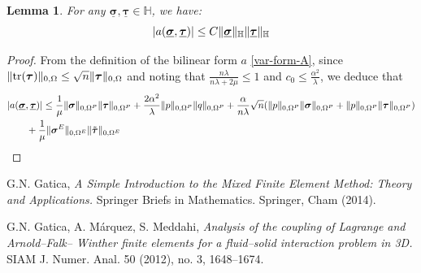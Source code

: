 \documentclass[11pt]{article}
\numberwithin{equation}{section}
\newtheorem{lem}[thm]{Lemma}
\newcommand{\tr}{\operatorname*{tr}}
\def\b{\boldsymbol}
\DeclarePairedDelimiter\norm{\lVert}{\rVert}
\DeclarePairedDelimiter\abs{\lvert}{\rvert}
\numberwithin{equation}{section}
\begin{document}
\begin{lem}
	For any $\underline{\b \sigma}, \underline{\b \tau} \in \mathbb{H}$, we have:
	\begin{equation*}
		\abs{a(\underline{\b \sigma},\underline{\b \tau})} \leq C \norm{\underline{\b \sigma}}_{\mathbb{H}} \norm{\underline{\b \tau}}_{\mathbb{H}}
	\end{equation*}
\end{lem}
\begin{proof}
	From the definition of the bilinear form $a$ \eqref{var-form-A}, since $\norm{\tr({\b \tau})}_{0,\Omega} \leq \sqrt{n}\norm{{\b \tau}}_{0,\Omega}$ and noting that $\frac{n\lambda}{n\lambda+2\mu}\leq 1$ and $c_0\leq \frac{\alpha^2}{\lambda}$, we deduce that
	\begin{align*}
		&\abs{a(\underline{\b \sigma},\underline{\b \tau})} \leq \frac{1}{\mu} \norm{{\b \sigma}}_{0,\Omega^P}\norm{{\b \tau}}_{0,\Omega^P}+\frac{2\alpha^2}{\lambda} \norm{p}_{0,\Omega^P}\norm{q}_{0,\Omega^P} + \frac{\alpha}{n\lambda}\sqrt{n} (\norm{p}_{0,\Omega^P}\norm{{\b \sigma}}_{0,\Omega^P}+\norm{p}_{0,\Omega^P}\norm{{\b \tau}}_{0,\Omega^P})\\
		&\qquad + \frac{1}{\mu} \norm{{\b \sigma^E}}_{0,\Omega^E}\norm{\tilde{\b \tau}}_{0,\Omega^E}
	\end{align*}	
\end{proof}


	\begin{thebibliography}{99}
		\small
		{\sc G.N. Gatica}, {\it A Simple Introduction to the Mixed Finite Element Method: Theory and Applications.} Springer Briefs in
		Mathematics. Springer, Cham (2014).
		
		{\sc G.N. Gatica,  A. M\'arquez, S. Meddahi}, {\it Analysis of the coupling of Lagrange and Arnold--Falk--
			Winther finite elements for a fluid--solid interaction problem in 3D.} SIAM J. Numer. Anal. 50 (2012), no. 3, 1648--1674.	
		
	\end{thebibliography}
\end{document}
